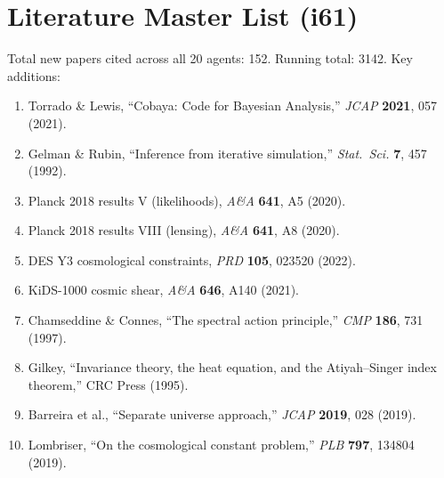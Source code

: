 \documentclass[11pt,a4paper]{article}
\begin{document}
\section{Literature Master List (i61)}
\label{sec:literature}

Total new papers cited across all 20 agents: 152. Running total: 3142. Key additions:

\begin{enumerate}
\item Torrado \& Lewis, ``Cobaya: Code for Bayesian Analysis,'' \textit{JCAP} \textbf{2021}, 057 (2021).
\item Gelman \& Rubin, ``Inference from iterative simulation,'' \textit{Stat.\ Sci.} \textbf{7}, 457 (1992).
\item Planck 2018 results V (likelihoods), \textit{A\&A} \textbf{641}, A5 (2020).
\item Planck 2018 results VIII (lensing), \textit{A\&A} \textbf{641}, A8 (2020).
\item DES Y3 cosmological constraints, \textit{PRD} \textbf{105}, 023520 (2022).
\item KiDS-1000 cosmic shear, \textit{A\&A} \textbf{646}, A140 (2021).
\item Chamseddine \& Connes, ``The spectral action principle,'' \textit{CMP} \textbf{186}, 731 (1997).
\item Gilkey, ``Invariance theory, the heat equation, and the Atiyah--Singer index theorem,'' CRC Press (1995).
\item Barreira et al., ``Separate universe approach,'' \textit{JCAP} \textbf{2019}, 028 (2019).
\item Lombriser, ``On the cosmological constant problem,'' \textit{PLB} \textbf{797}, 134804 (2019).
\end{enumerate}
\end{document}
